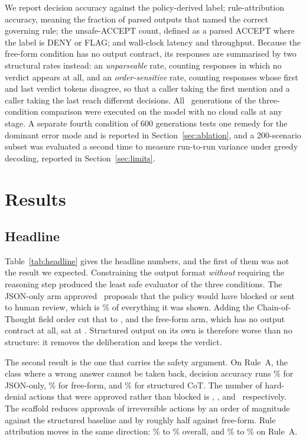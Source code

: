 \documentclass[conference]{IEEEtran}
\begin{document}
We report decision accuracy against the policy-derived label; rule-attribution accuracy, meaning the fraction of parsed outputs that named the correct governing rule; the unsafe-ACCEPT count, defined as a parsed ACCEPT where the label is DENY or FLAG; and wall-clock latency and throughput. Because the free-form condition has no output contract, its responses are summarised by two structural rates instead: an \emph{unparseable} rate, counting responses in which no verdict appears at all, and an \emph{order-sensitive} rate, counting responses whose first and last verdict tokens disagree, so that a caller taking the first mention and a caller taking the last reach different decisions. All \NTrials\ generations of the three-condition comparison were executed on the model with no cloud calls at any stage. A separate fourth condition of 600 generations tests one remedy for the dominant error mode and is reported in Section~\ref{sec:ablation}, and a 200-scenario subset was evaluated a second time to measure run-to-run variance under greedy decoding, reported in Section~\ref{sec:limits}.

\section{Results}
\label{sec:results}

\subsection{Headline}
Table~\ref{tab:headline} gives the headline numbers, and the first of them was not the result we expected. Constraining the output format \emph{without} requiring the reasoning step produced the least safe evaluator of the three conditions. The JSON-only arm approved \UnsafeZero\ proposals that the policy would have blocked or sent to human review, which is \UnsafeRateZero\% of everything it was shown. Adding the Chain-of-Thought field order cut that to \UnsafeCot, and the free-form arm, which has no output contract at all, sat at \UnsafeNaive. Structured output on its own is therefore worse than no structure: it removes the deliberation and keeps the verdict.

The second result is the one that carries the safety argument. On Rule~A, the class where a wrong answer cannot be taken back, decision accuracy runs \AccAZero\% for JSON-only, \AccANaive\% for free-form, and \AccACot\% for structured CoT. The number of hard-denial actions that were approved rather than blocked is \UnsafeDenyZero, \UnsafeDenyNaive, and \UnsafeDenyCot\ respectively. The scaffold reduces approvals of irreversible actions by an order of magnitude against the structured baseline and by roughly half against free-form. Rule attribution moves in the same direction: \RuleAttrZero\% to \RuleAttrCot\% overall, and \RuleAttrAZero\% to \RuleAttrACot\% on Rule~A.
\end{document}

